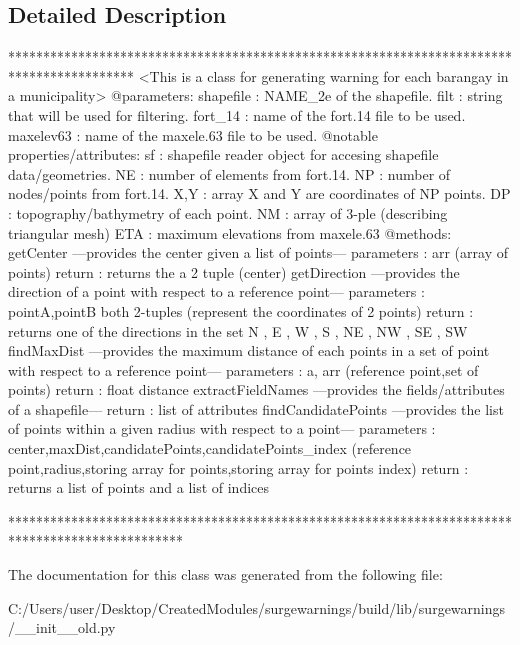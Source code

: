 \subsection{Detailed Description}
\begin{DoxyVerb}******************************************************************************************
<This is a class for generating warning for each barangay in a municipality>
@parameters:
    shapefile   : NAME_2e of the shapefile.
    filt        : string that will be used for filtering.
    fort_14     : name of the fort.14 file to be used.
    maxelev63   : name of the maxele.63 file to be used.
@notable properties/attributes:
    sf          : shapefile reader object for accesing shapefile data/geometries.
    NE          : number of elements from fort.14.
    NP          : number of nodes/points from fort.14.
    X,Y         : array X and Y are coordinates of NP points.
    DP          : topography/bathymetry of each point.
    NM          : array of 3-ple (describing triangular mesh)
    ETA         : maximum elevations from maxele.63
@methods:
    getCenter
        ---provides the center given a list of points---
        parameters  : arr (array of points)
        return      : returns the a 2 tuple (center)        
    getDirection 
        ---provides the direction of a point with respect to a reference point---
        parameters  : pointA,pointB both 2-tuples (represent the coordinates of 2 points)
        return      : returns one of the directions in the set {N , E , W , S , NE , NW , SE , SW}  
    findMaxDist
        ---provides the maximum distance of each points in a set of point with respect to a reference point---
        parameters  : a, arr (reference point,set of points)
        return      : float distance
    extractFieldNames
        ---provides the fields/attributes of a shapefile---
        return      : list of attributes
    findCandidatePoints
        ---provides the list of points  within a given radius with respect to a point---
        parameters  : center,maxDist,candidatePoints,candidatePoints_index (reference point,radius,storing array for points,storing array for points index)
        return      : returns a list of points and a list of indices
    
*************************************************************************************************\end{DoxyVerb}
 

The documentation for this class was generated from the following file\+:\begin{DoxyCompactItemize}
\item 
C\+:/\+Users/user/\+Desktop/\+Created\+Modules/surgewarnings/build/lib/surgewarnings/\+\_\+\+\_\+init\+\_\+\+\_\+old.\+py\end{DoxyCompactItemize}
